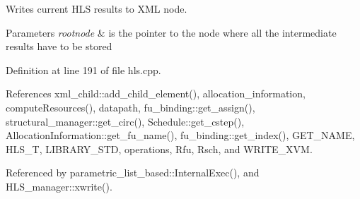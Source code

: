 Writes current H\+LS results to X\+ML node. 


\begin{DoxyParams}{Parameters}
{\em rootnode} & is the pointer to the node where all the intermediate results have to be stored \\
\hline
\end{DoxyParams}


Definition at line 191 of file hls.\+cpp.



References xml\+\_\+child\+::add\+\_\+child\+\_\+element(), allocation\+\_\+information, compute\+Resources(), datapath, fu\+\_\+binding\+::get\+\_\+assign(), structural\+\_\+manager\+::get\+\_\+circ(), Schedule\+::get\+\_\+cstep(), Allocation\+Information\+::get\+\_\+fu\+\_\+name(), fu\+\_\+binding\+::get\+\_\+index(), G\+E\+T\+\_\+\+N\+A\+ME, H\+L\+S\+\_\+T, L\+I\+B\+R\+A\+R\+Y\+\_\+\+S\+TD, operations, Rfu, Rsch, and W\+R\+I\+T\+E\+\_\+\+X\+VM.



Referenced by parametric\+\_\+list\+\_\+based\+::\+Internal\+Exec(), and H\+L\+S\+\_\+manager\+::xwrite().

